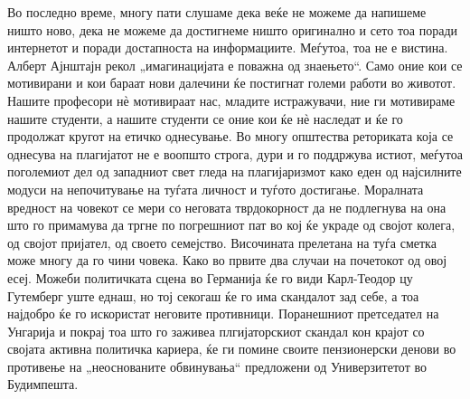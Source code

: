 \documentclass[12pt,a4paper]{article}
\begin{document}
Во последно време, многу пати слушаме дека веќе не можеме да напишеме ништо
ново, дека не можеме да достигнеме ништо оригинално и сето тоа поради интернетот
и поради достапноста на информациите. Меѓутоа, тоа не е вистина. Алберт
Ајнштајн рекол „имагинацијата е поважна од знаењето“. Само оние кои се
мотивирани и кои бараат нови далечини ќе постигнат големи работи во животот.
Нашите професори нѐ мотивираат нас, младите истражувачи, ние ги мотивираме
нашите студенти, а нашите студенти се оние кои ќе нѐ наследат и ќе го продолжат
кругот на етичко однесување. Во многу општества реториката која се однесува на
плагијатот не е воопшто строга, дури и го поддржува истиот, меѓутоа поголемиот
дел од западниот свет гледа на плагијаризмот како еден од најсилните модуси на
непочитување на туѓата личност и туѓото достигање. Моралната вредност на
човекот се мери со неговата тврдокорност да не подлегнува на она што го примамува да
тргне по погрешниот пат во кој ќе украде од својот колега, од својот пријател,
од своето семејство. Височината прелетана на туѓа сметка може многу да го чини
човека. Како во првите два случаи на почетокот од овој есеј. Можеби политичката
сцена во Германија ќе го види Карл-Теодор цу Гутемберг уште еднаш, но тој
секогаш ќе го има скандалот зад себе, а тоа најдобро ќе го искористат неговите
противници. Поранешниот претседател на Унгарија и покрај тоа што го заживеа
плгијаторскиот скандал кон крајот со својата активна политичка кариера, ќе ги
помине своите пензионерски денови во противење на „неоснованите обвинувања“
предложени од Универзитетот во Будимпешта.
\end{document}
